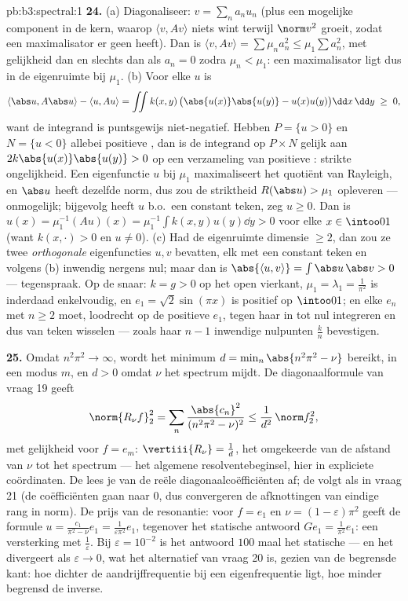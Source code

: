 \begin{solution}{pb:b3:spectral:1}
\textbf{24.} (a) Diagonaliseer: $v = \sum_na_nu_n$ (plus een
mogelijke component in de kern, waarop $\langle v, Av\rangle$
niets wint terwijl $\norm v^2$ groeit, zodat een maximalisator er
geen heeft). Dan is $\langle v, Av\rangle = \sum\mu_na_n^2 \leq
\mu_1\sum a_n^2$, met gelijkheid dan en slechts dan als $a_n = 0$
zodra $\mu_n < \mu_1$: een maximalisator ligt dus in de
eigenruimte bij $\mu_1$. (b) Voor elke $u$ is
\[
\langle\abs u, A\abs u\rangle - \langle u, Au\rangle
= \iint k(x,y)\,\bigl(\abs{u(x)}\abs{u(y)} -
u(x)u(y)\bigr)\dd x\,\dd y \;\geq\; 0,
\]
want de integrand is puntsgewijs niet-negatief. Hebben $P = \{u >
0\}$ en $N = \{u < 0\}$ allebei positieve , dan is de
integrand op $P\times N$ gelijk aan $2k\abs{u(x)}\abs{u(y)} > 0$
op een verzameling van positieve : strikte ongelijkheid. Een
eigenfunctie $u$ bij $\mu_1$ maximaliseert het quotiënt van
Rayleigh, en $\abs u$ heeft dezelfde norm, dus zou de striktheid
$R(\abs u) > \mu_1$ opleveren --- onmogelijk; bijgevolg heeft $u$
b.o.\ een constant teken, zeg $u \geq 0$. Dan is $u(x) =
\mu_1^{-1}(Au)(x) = \mu_1^{-1}\int k(x,y)u(y)\dd y > 0$ voor elke
$x \in \intoo01$ (want $k(x,\cdot) > 0$ en $u \neq 0$). (c) Had
de eigenruimte dimensie $\geq 2$, dan zou ze twee
\emph{orthogonale} eigenfuncties $u, v$ bevatten, elk met een
constant teken en volgens (b) inwendig nergens nul; maar dan is
$\abs{\langle u, v\rangle} = \int\abs u\,\abs v > 0$ ---
tegenspraak. Op de snaar: $k = g > 0$ op het open vierkant,
$\mu_1 = \lambda_1 = \frac1{\pi^2}$ is inderdaad enkelvoudig, en
$e_1 = \sqrt2\sin(\pi x)$ is positief op $\intoo01$; en elke
$e_n$ met $n \geq 2$ moet, loodrecht op de positieve $e_1$,
tegen haar in tot nul integreren en dus van teken wisselen ---
zoals haar $n - 1$ inwendige nulpunten $\frac kn$ bevestigen.

\textbf{25.} Omdat $n^2\pi^2 \to \infty$, wordt het minimum $d =
\min_n\abs{n^2\pi^2 - \nu}$ bereikt, in een modus $m$, en $d > 0$
omdat $\nu$ het spectrum mijdt. De diagonaalformule van vraag 19
geeft
\[
\norm{R_\nu f}_2^2 =
\sum_n\frac{\abs{c_n}^2}{(n^2\pi^2 - \nu)^2}
\leq \frac1{d^2}\,\norm f_2^2,
\]
met gelijkheid voor $f = e_m$: $\vertiii{R_\nu} = \frac1d$, het
omgekeerde van de afstand van $\nu$ tot het spectrum --- het
algemene resolventebeginsel, hier in expliciete coördinaten. De
 lees je van de reële diagonaalcoëfficiënten
af; de  volgt als in vraag 21 (de coëfficiënten gaan
naar $0$, dus convergeren de afknottingen van eindige rang in
norm). De prijs van de resonantie: voor $f = e_1$ en $\nu =
(1-\varepsilon)\pi^2$ geeft de formule $u = \frac{c_1}{\pi^2 -
\nu}e_1 = \frac1{\varepsilon\pi^2}e_1$, tegenover het statische
antwoord $Ge_1 = \frac1{\pi^2}e_1$: een versterking met
$\frac1\varepsilon$. Bij $\varepsilon = 10^{-2}$ is het antwoord
$100$ maal het statische --- en het divergeert als $\varepsilon
\to 0$, wat het alternatief van vraag 20 is, gezien van de
begrensde kant: hoe dichter de aandrijffrequentie bij een
eigenfrequentie ligt, hoe minder begrensd de inverse.
\end{solution}
